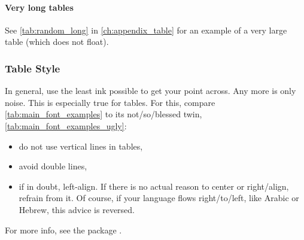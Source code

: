 \begin{landscape}
\begin{table}[tbp]
{        }

    \end{table}
\end{landscape}

\paragraph{Very long tables}

See \cref{tab:random_long} in \cref{ch:appendix_table} for an example of a very large table (which does not float).

\subsubsection{Table Style}

In general, use the least ink possible to get your point across.
Any more is only noise.
This is especially true for tables.
For this, compare \cref{tab:main_font_examples} to its not\-/so\-/blessed
twin, \cref{tab:main_font_examples_ugly}:
\begin{itemize}
    \item do not use vertical lines in tables,
    \item avoid double lines,
    \item if in doubt, left-align.
          If there is no actual reason to center or right\-/align, refrain from it.
          Of course, if your language flows right\-/to\-/left, like Arabic or Hebrew,
          this advice is reversed.
\end{itemize}
For more info, see the package .

